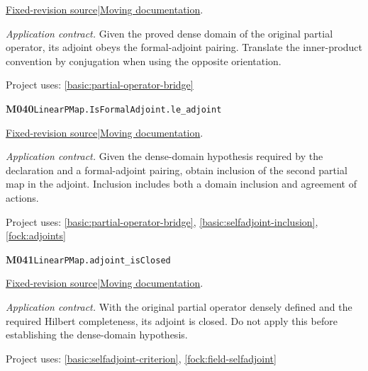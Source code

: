 \documentclass[11pt,a4paper]{article}
\theoremstyle{definition}
\theoremstyle{remark}
\begin{document}
\href{https://github.com/leanprover-community/mathlib4/blob/9bac2d0692944a775113f7c130fd5e5b4608a854/Mathlib/Analysis/InnerProductSpace/LinearPMap.lean}{Fixed-revision source}\quad|\quad\href{https://leanprover-community.github.io/mathlib4_docs/Mathlib/Analysis/InnerProductSpace/LinearPMap.html#LinearPMap.adjoint_isFormalAdjoint}{Moving documentation}.\par
\noindent\textit{Application contract.} Given the proved dense domain of the original partial operator, its adjoint obeys the formal-adjoint pairing. Translate the inner-product convention by conjugation when using the opposite orientation.\par
{\small Project uses: \ref{basic:partial-operator-bridge}}\par\medskip

\noindent\textbf{M040}\label{base:M040}\quad\nolinkurl{LinearPMap.IsFormalAdjoint.le_adjoint}

\href{https://github.com/leanprover-community/mathlib4/blob/9bac2d0692944a775113f7c130fd5e5b4608a854/Mathlib/Analysis/InnerProductSpace/LinearPMap.lean}{Fixed-revision source}\quad|\quad\href{https://leanprover-community.github.io/mathlib4_docs/Mathlib/Analysis/InnerProductSpace/LinearPMap.html#LinearPMap.IsFormalAdjoint.le_adjoint}{Moving documentation}.\par
\noindent\textit{Application contract.} Given the dense-domain hypothesis required by the declaration and a formal-adjoint pairing, obtain inclusion of the second partial map in the adjoint. Inclusion includes both a domain inclusion and agreement of actions.\par
{\small Project uses: \ref{basic:partial-operator-bridge}, \ref{basic:selfadjoint-inclusion}, \ref{fock:adjoints}}\par\medskip

\noindent\textbf{M041}\label{base:M041}\quad\nolinkurl{LinearPMap.adjoint_isClosed}

\href{https://github.com/leanprover-community/mathlib4/blob/9bac2d0692944a775113f7c130fd5e5b4608a854/Mathlib/Analysis/InnerProductSpace/LinearPMap.lean}{Fixed-revision source}\quad|\quad\href{https://leanprover-community.github.io/mathlib4_docs/Mathlib/Analysis/InnerProductSpace/LinearPMap.html#LinearPMap.adjoint_isClosed}{Moving documentation}.\par
\noindent\textit{Application contract.} With the original partial operator densely defined and the required Hilbert completeness, its adjoint is closed. Do not apply this before establishing the dense-domain hypothesis.\par
{\small Project uses: \ref{basic:selfadjoint-criterion}, \ref{fock:field-selfadjoint}}\par\medskip
\end{document}
